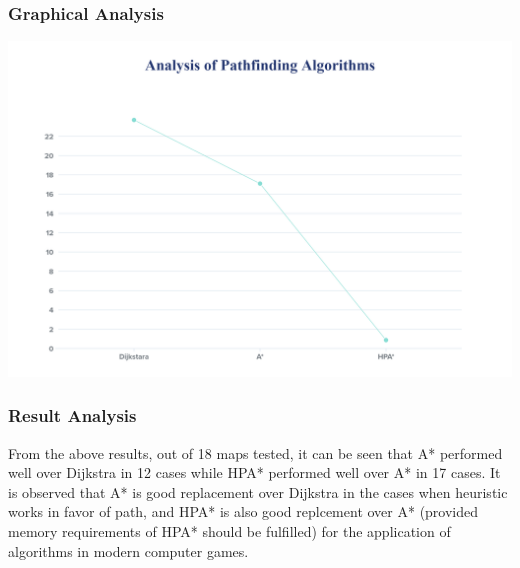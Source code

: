 \documentclass[a4paper, 12pt]{article}
\begin{document}
\subsubsection{Graphical Analysis}
\includegraphics[width=400pt]{analysis-graph.png}
\vspace{1cm}
\subsubsection{Result Analysis}
\par From the above results, out of 18 maps tested, it can be seen that A* performed well over Dijkstra in 12 cases while HPA* performed well over A* in 17 cases. It is observed that A* is good replacement over Dijkstra in the cases when heuristic works in favor of path, and HPA* is also good replcement over A* (provided memory requirements of HPA* should be fulfilled) for the application of algorithms in modern computer games.




			
		
\end{document}
